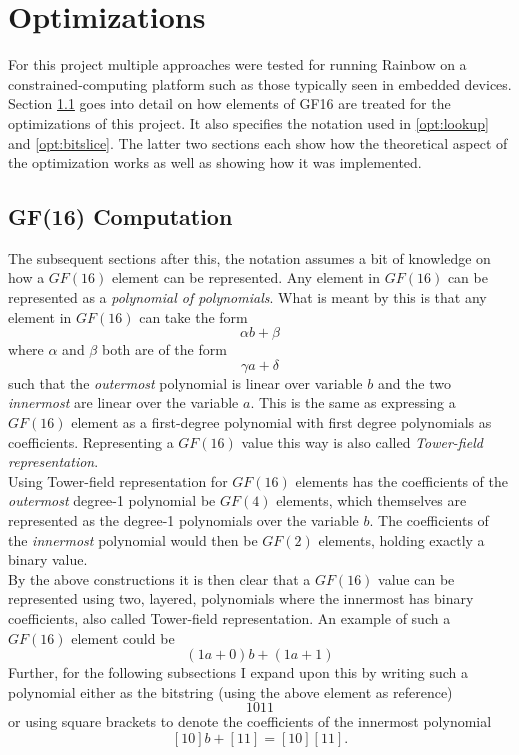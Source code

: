 \section{Optimizations} \label{opti}
For this project multiple approaches were tested for running Rainbow on a constrained-computing platform such as those typically seen in embedded devices. Section \ref{opt:gf16comp} goes into detail on how elements of GF16 are treated for the optimizations of this project. It also specifies the notation used in \cref{opt:lookup} and \cref{opt:bitslice}. The latter two sections each show how the theoretical aspect of the optimization works as well as showing how it was implemented.
\subsection{GF(16) Computation} \label{opt:gf16comp}
The subsequent sections after this, the notation assumes a bit of knowledge on how a $GF(16)$ element can be represented. Any element in $GF(16)$ can be represented as a \emph{polynomial of polynomials}. What is meant by this is that any element in $GF(16)$ can take the form
$$
    \alpha b + \beta
$$
where $\alpha$ and $\beta$ both are of the form 
$$
    \gamma a + \delta
$$
such that the \emph{outermost} polynomial is linear over variable $b$ and the two \emph{innermost} are linear over the variable $a$. This is the same as expressing a $GF(16)$ element as a first-degree polynomial with first degree polynomials as coefficients. Representing a $GF(16)$ value this way is also called \emph{Tower-field representation}.
\medskip\\
Using Tower-field representation for $GF(16)$ elements has the coefficients of the \emph{outermost} degree-1 polynomial be $GF(4)$ elements, which themselves are represented as the degree-1 polynomials over the variable $b$. The coefficients of the \emph{innermost} polynomial would then be $GF(2)$ elements, holding exactly a binary value.
\medskip\\
By the above constructions it is then clear that a $GF(16)$ value can be represented using two, layered, polynomials where the innermost has binary coefficients, also called Tower-field representation. An example of such a $GF(16)$ element could be
$$
    (1a + 0) b + (1a + 1)
$$
Further, for the following subsections I expand upon this by writing such a polynomial either as the bitstring (using the above element as reference)
$$
    1011
$$
or using square brackets to denote the coefficients of the innermost polynomial
$$
    [10]b + [11] = [10][11].
$$
